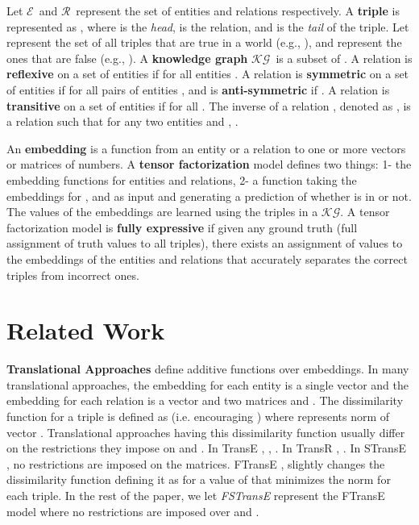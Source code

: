 \documentclass{article}
\newcommand{\entities}{\ensuremath{\mathcal{E}}}
\newcommand{\relations}{\ensuremath{\mathcal{R}}}
\newcommand{\KG}{\ensuremath{\mathcal{KG}}}
\begin{document}
Let \entities\ and \relations\ represent the set of entities and relations respectively. 
A \textbf{triple} is represented as , where  is the \emph{head},  is the relation, and  is the \emph{tail} of the triple. 
Let  represent the set of all triples that are true in a world (e.g., ), and  represent the ones that are false (e.g., ). 
A \textbf{knowledge graph} \KG\ is a subset of . 
A relation  is \textbf{reflexive} on a set  of entities if  for all entities . A relation  is \textbf{symmetric} on a set  of entities if  for all pairs of entities , and is \textbf{anti-symmetric} if . A relation  is \textbf{transitive} on a set  of entities if  for all . The inverse of a relation , denoted as , is a relation such that for any two entities  and , . 

An \textbf{embedding} is a function from an entity or a relation to one or more vectors or matrices of numbers. 
A \textbf{tensor factorization} model defines two things: 1- the embedding functions for entities and relations, 2- a function  taking the embeddings for ,  and  as input and generating a prediction of whether  is in  or not. The values of the embeddings are learned using the triples in a \KG.
A tensor factorization model is \textbf{fully expressive} if given any ground truth (full assignment of truth values to all triples), there exists an assignment of values to the embeddings of the entities and relations that accurately separates the correct triples from incorrect ones. 

\section{Related Work}
\textbf{Translational Approaches} define additive functions over embeddings. In many translational approaches, the embedding for each entity  is a single vector  and the embedding for each relation  is a vector  and two matrices  and . The dissimilarity function for a triple  is defined as  (i.e. encouraging ) where  represents norm  of vector . Translational approaches having this dissimilarity function usually differ on the restrictions they impose on  and . In TransE \cite{bordes2013translating}, , . In TransR \cite{lin2015learning}, . In STransE \cite{StransE}, no restrictions are imposed on the matrices. FTransE \cite{feng2016knowledge}, slightly changes the dissimilarity function defining it as  for a value of  that minimizes the norm for each triple. In the rest of the paper, we let \emph{FSTransE} represent the FTransE model where no restrictions are imposed over  and .
\end{document}
